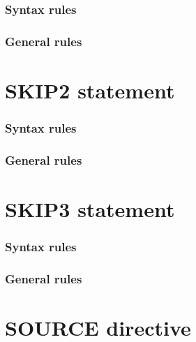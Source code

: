 \begin{syntax}[\miscextcolour]
\end{syntax}

\subsubsection{Syntax rules}

\subsubsection{General rules}

\section{SKIP2 statement}

\begin{syntax}[\miscextcolour]
\end{syntax}

\subsubsection{Syntax rules}

\subsubsection{General rules}

\section{SKIP3 statement}

\begin{syntax}[\miscextcolour]
\end{syntax}

\subsubsection{Syntax rules}

\subsubsection{General rules}

\section{SOURCE directive}


